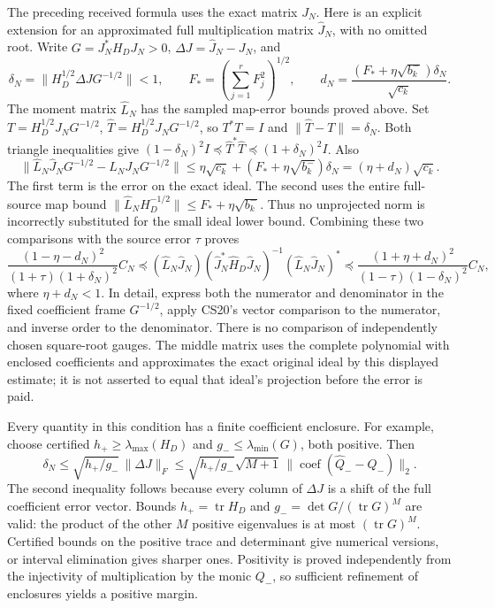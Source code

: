 \documentclass[11pt]{article}
\begin{document}
The preceding received formula uses the exact matrix \(J_N\). Here is an explicit extension for an approximated full multiplication matrix \(\widehat J_N\), with no omitted root. Write \(G=J_N^*H_DJ_N>0\), \(\Delta J=\widehat J_N-J_N\), and \[
 \delta_N=\|H_D^{1/2}\Delta JG^{-1/2}\|<1,\qquad
 F_*=\left(\sum_{j=1}^rF_j^2\right)^{1/2},\qquad
 d_N=\frac{(F_*+\eta\sqrt{b_k^-})\delta_N}{\sqrt{c_k}}.
\] The moment matrix \(\widehat L_N\) has the sampled map-error bounds proved above. Set \(T=H_D^{1/2}J_NG^{-1/2}\), \(\widehat T=H_D^{1/2}\widehat J_NG^{-1/2}\), so \(T^*T=I\) and \(\|\widehat T-T\|=\delta_N\). Both triangle inequalities give \((1-\delta_N)^2I\preceq\widehat T^*\widehat T\preceq(1+\delta_N)^2I\). Also \[
 \|\widehat L_N\widehat J_NG^{-1/2}-L_NJ_NG^{-1/2}\|
 \le\eta\sqrt{c_k}+(F_*+\eta\sqrt{b_k^-})\delta_N
 =(\eta+d_N)\sqrt{c_k}.
\] The first term is the error on the exact ideal. The second uses the entire full-source map bound \(\|\widehat L_NH_D^{-1/2}\|\le F_*+\eta\sqrt{b_k^-}\). Thus no unprojected norm is incorrectly substituted for the small ideal lower bound. Combining these two comparisons with the source error \(\tau\) proves \[
 \boxed{\frac{(1-\eta-d_N)^2}{(1+\tau)(1+\delta_N)^2}C_N
 \preceq
 (\widehat L_N\widehat J_N)(\widehat J_N^*\widehat H_D\widehat J_N)^{-1}(\widehat L_N\widehat J_N)^*
 \preceq\frac{(1+\eta+d_N)^2}{(1-\tau)(1-\delta_N)^2}C_N,}
 \tag{CS21}
\] where \(\eta+d_N<1\). In detail, express both the numerator and denominator in the fixed coefficient frame \(G^{-1/2}\), apply CS20's vector comparison to the numerator, and inverse order to the denominator. There is no comparison of independently chosen square-root gauges. The middle matrix uses the complete polynomial with enclosed coefficients and approximates the exact original ideal by this displayed estimate; it is not asserted to equal that ideal's projection before the error is paid.

Every quantity in this condition has a finite coefficient enclosure. For example, choose certified \(h_+\ge\lambda_{\max}(H_D)\) and \(g_-\le\lambda_{\min}(G)\), both positive. Then \[
 \delta_N\le\sqrt{h_+/g_-}\,\|\Delta J\|_F
 \le\sqrt{h_+/g_-}\sqrt{M+1}\,\|\operatorname{coef}(\widehat Q_--Q_-)\|_2.
 \tag{CS22}
\] The second inequality follows because every column of \(\Delta J\) is a shift of the full coefficient error vector. Bounds \(h_+=\operatorname{tr}H_D\) and \(g_-=\det G/(\operatorname{tr}G)^M\) are valid: the product of the other \(M\) positive eigenvalues is at most \((\operatorname{tr}G)^M\). Certified bounds on the positive trace and determinant give numerical versions, or interval elimination gives sharper ones. Positivity is proved independently from the injectivity of multiplication by the monic \(Q_-\), so sufficient refinement of enclosures yields a positive margin.
\end{document}
